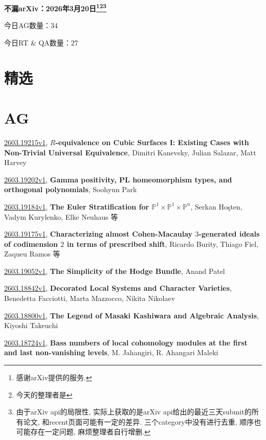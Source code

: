 \documentclass[9pt, a4paper]{article}
\theoremstyle{plain}
\theoremstyle{definition}
\theoremstyle{remark}
\newcommand{\arxiv}[3]{\href{https://arxiv.org/abs/#1}{#1}, \textbf{\textcolor{arxivblue}{#2}}, #3}
\newcommand{\AGnumber}{34}
\newcommand{\RTQAnumber}{27}
\newcommand{\NewestDate}{2026年3月20日}
\newcommand{\todayarXiver}{} %
\begin{document}
\begin{center}
    \Huge\textbf{不漏arXiv：\NewestDate\footnote{感谢arXiv提供的服务.}\footnote{今天的整理者是\todayarXiver}\footnote{由于arXiv api的局限性, 实际上获取的是arXiv api给出的最近三天submit的所有论文, 和recent页面可能有一定的差异. 三个category中没有进行去重, 顺序也可能存在一定问题, 麻烦整理者自行增删.}} \\
\end{center}

\setcounter{section}{-1}

\begin{center}
    今日AG数量：\AGnumber
    
    今日RT \& QA数量：\RTQAnumber
    
\end{center}


\section{精选}


\section{AG}
\arxiv{2603.19215v1}{$R$-equivalence on Cubic Surfaces I: Existing Cases with Non-Trivial Universal Equivalence}{Dimitri Kanevsky, Julian Salazar, Matt Harvey}

\arxiv{2603.19202v1}{Gamma positivity, PL homeomorphism types, and orthogonal polynomials}{Soohyun Park}

\arxiv{2603.19184v1}{The Euler Stratification for $\mathbb{P}^1 \times \mathbb{P}^1 \times \mathbb{P}^n$}{Serkan Hoşten, Vadym Kurylenko, Elke Neuhaus 等}

\arxiv{2603.19175v1}{Characterizing almost Cohen-Macaulay $3$-generated ideals of codimension $2$ in terms of prescribed shift}{Ricardo Burity, Thiago Fiel, Zaqueu Ramos 等}

\arxiv{2603.19052v1}{The Simplicity of the Hodge Bundle}{Anand Patel}

\arxiv{2603.18842v1}{Decorated Local Systems and Character Varieties}{Benedetta Facciotti, Marta Mazzocco, Nikita Nikolaev}

\arxiv{2603.18800v1}{The Legend of Masaki Kashiwara and Algebraic Analysis}{Kiyoshi Takeuchi}

\arxiv{2603.18724v1}{Bass numbers of local cohomology modules at the first and last non-vanishing levels}{M. Jahangiri, R. Ahangari Maleki}
\end{document}
